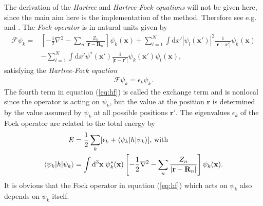 \documentclass[twoside,        %
			   11pt,			%
               BCOR10mm,       %
               ngerman,english  %
               ]{scrartcl}
\begin{document}
The derivation of the \textit{Hartree} and \textit{Hartree-Fock equations} will not be given here, since the main aim here is the implementation of the method. Therefore see e.g. \cite[p. 56-60]{Thijssen2007} and \cite[chapter 3]{Jensen2013}. The \textit{Fock operator} is in natural units given by
 \begin{align} \label{eq:hf}
 \mathcal{F}\psi_k = &\left[-\frac{1}{2} \nabla^2 
 - \sum_n \frac{Z_n}{|\mathbf{r}- \mathbf{R}_n|}\right]\psi_k(\mathbf{x}) + \nonumber
 \sum_{l=1}^N \int \text{d}x' |\psi_l(\mathbf{x}')|^2 \frac{1}{|\mathbf{r}-\mathbf{r}'|} \psi_k(\mathbf{x}) \\
&- \sum_{l=1}^N \int \text{d}x' \psi^*(\mathbf{x}')\frac{1}{|\mathbf{r}-\mathbf{r}'|} \psi_k(\mathbf{x}')\psi_l(\mathbf{x})\text{,}
\end{align}
 satisfying the \textit{Hartree-Fock equation}
\begin{align*}
\mathcal{F} \psi_k = \epsilon_k \psi_k \text{.}
\end{align*} The fourth term in equation (\ref{eq:hf}) is called the exchange term \cite[p. 55]{Thijssen2007} and is nonlocal since the operator is acting on $\psi_k$, but the value at the position $\mathbf{r}$ is determined by the value assumed by $\psi_k$ at all possible positions $\mathbf{r}'$. The eigenvalues $\epsilon_k$ of the Fock operator are related to the total energy by
 \begin{align*}
 E &= \frac{1}{2} \sum_k [\epsilon_k + \braket{\psi_k|h|\psi_k}] \text{, with}\\
 \braket{\psi_k|h|\psi_k} &= \int \text{d}^3\mathbf{x}\; \psi_k^*(\mathbf{x}) \left[-\frac{1}{2} \nabla^2 
 - \sum_n \frac{Z_n}{|\mathbf{r}- \mathbf{R}_n|}\right] \psi_k(\mathbf{x}) \text{.}
 \end{align*} It is obvious that the Fock operator in equation (\ref{eq:hf}) which acts on $\psi_k$ also depends on $\psi_k$ itself.
    
    
    
    
\end{document}
